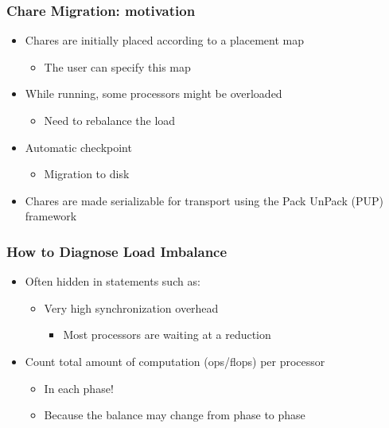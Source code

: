 \begin{frame}[fragile]
\frametitle{Chare Migration: motivation}
\begin{itemize}
\item Chares are initially placed according to a placement map
\begin{itemize}
\item The user can specify this map
\end{itemize}
\item While running, some processors might be overloaded
\begin{itemize}
\item Need to rebalance the load
\end{itemize}
\item Automatic checkpoint
\begin{itemize}
\item Migration to disk
\end{itemize}
\item Chares are made serializable for transport using the Pack UnPack (PUP) framework
\end{itemize}
\end{frame}


\begin{frame}[fragile]
\frametitle{How to Diagnose Load Imbalance}
\begin{itemize}
 \item Often hidden in statements such as:
 \begin{itemize}
  \item Very high synchronization overhead
  \begin{itemize}
   \item Most processors are waiting at a reduction
  \end{itemize}
 \end{itemize}
 \item Count total amount of computation (ops/flops) per processor
 \begin{itemize}
  \item In each phase! 
  \item Because the balance may change from phase to phase
 \end{itemize}
\end{itemize}
\end{frame}

